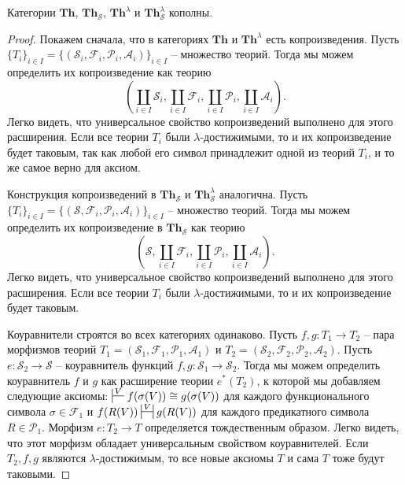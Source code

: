\documentclass[reqno]{amsart}
\theoremstyle{definition}
\theoremstyle{remark}
\newcommand{\bcat}[1]{\mathbf{#1}}
\newcommand{\Th}{\bcat{Th}}
\begin{document}
\begin{prop}[th-colimits]
Категории $\Th$, $\Th_\mathcal{S}$, $\Th^\lambda$ и $\Th_\mathcal{S}^\lambda$ кополны.
\end{prop}
\begin{proof}
Покажем сначала, что в категориях $\Th$ и $\Th^\lambda$ есть копроизведения.
Пусть $\{ T_i \}_{i \in I} = \{ (\mathcal{S}_i,\mathcal{F}_i,\mathcal{P}_i,\mathcal{A}_i) \}_{i \in I}$ -- множество теорий.
Тогда мы можем определить их копроизведение как теорию
\[ (\coprod\limits_{i \in I} \mathcal{S}_i, \coprod\limits_{i \in I} \mathcal{F}_i, \coprod\limits_{i \in I} \mathcal{P}_i, \coprod\limits_{i \in I} \mathcal{A}_i). \]
Легко видеть, что универсальное свойство копроизведений выполнено для этого расширения.
Если все теории $T_i$ были $\lambda$-достижимыми, то и их копроизведение будет таковым, так как любой его символ принадлежит одной из теорий $T_i$, и то же самое верно для аксиом.

Конструкция копроизведений в $\Th_\mathcal{S}$ и $\Th_\mathcal{S}^\lambda$ аналогична.
Пусть $\{ T_i \}_{i \in I} = \{ (\mathcal{S},\mathcal{F}_i,\mathcal{P}_i,\mathcal{A}_i) \}_{i \in I}$ -- множество теорий.
Тогда мы можем определить их копроизведение в $\Th_\mathcal{S}$ как теорию
\[ (\mathcal{S}, \coprod\limits_{i \in I} \mathcal{F}_i, \coprod\limits_{i \in I} \mathcal{P}_i, \coprod\limits_{i \in I} \mathcal{A}_i). \]
Легко видеть, что универсальное свойство копроизведений выполнено для этого расширения.
Если все теории $T_i$ были $\lambda$-достижимыми, то и их копроизведение будет таковым.

Коуравнители строятся во всех категориях одинаково.
Пусть $f,g : T_1 \to T_2$ -- пара морфизмов теорий $T_1 = (\mathcal{S}_1,\mathcal{F}_1,\mathcal{P}_1,\mathcal{A}_1)$ и $T_2 = (\mathcal{S}_2,\mathcal{F}_2,\mathcal{P}_2,\mathcal{A}_2)$.
Пусть $e : \mathcal{S}_2 \to \mathcal{S}$ -- коуравнитель функций $f,g : \mathcal{S}_1 \to \mathcal{S}_2$.
Тогда мы можем определить коуравнитель $f$ и $g$ как расширение теории $e^*(T_2)$, к которой мы добавляем следующие аксиомы:
$\sststile{}{V} f(\sigma(V)) \cong g(\sigma(V))$ для каждого функционального символа $\sigma \in \mathcal{F}_1$
и $f(R(V)) \ssststile{}{V} g(R(V))$ для каждого предикатного символа $R \in \mathcal{P}_1$.
Морфизм $e : T_2 \to T$ определяется тождественным образом.
Легко видеть, что этот морфизм обладает универсальным свойством коуравнителей.
Если $T_2,f,g$ являются $\lambda$-достижимым, то все новые аксиомы $T$ и сама $T$ тоже будут таковыми.
\end{proof}
\end{document}

